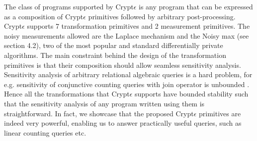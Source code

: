 {\par %
The class of programs supported by Crypt$\epsilon$ is any program that can be expressed as a composition of  Crypt$\epsilon$ primitives followed by arbitrary post-processing. Crypt$\epsilon$ supports 7 transformation primitives and 2 measurement primitives. The noisy measurements allowed are the Laplace mechanism and the Noisy max (see section 4.2), two of the most popular and standard differentially private algorithms. The main constraint behind the design of the transformation primitives is that their composition should allow seamless sensitivity analysis.  Sensitivity analysis of arbitrary relational algebraic queries is a hard problem, for e.g. sensitivity of conjunctive counting queries with join operator is unbounded \cite{sensitivity}. Hence all the transformations that Crypt$\epsilon$ supports have bounded stability \cite{PINQ} such that the sensitivity analysis of any program written using them is straightforward. In fact, we showcase that the proposed Crypt$\epsilon$ primitives are indeed very powerful, enabling us to answer practically useful queries, such as linear counting queries etc. 
\\ 
}
